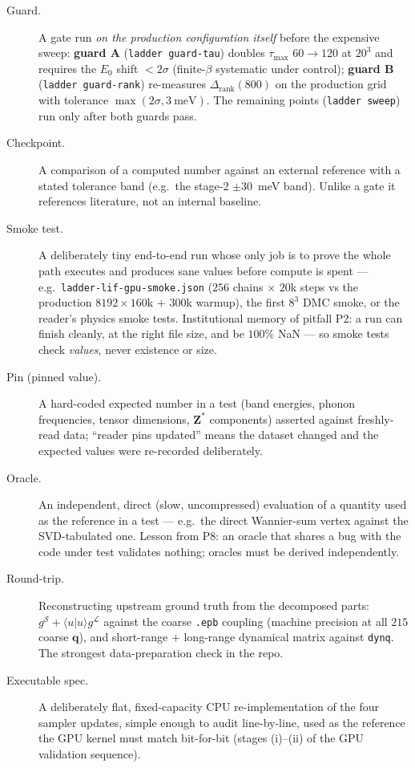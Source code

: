 \documentclass[11pt]{article}
\newcommand{\qv}{\mathbf{q}}
\newcommand{\term}[1]{\item[#1.]}
\begin{document}
\begin{description}
\term{Guard} A gate run \emph{on the production configuration itself} before the
  expensive sweep: \textbf{guard A} (\texttt{ladder guard-tau}) doubles
  $\tau_{\max}$ $60\to120$ at $20^{3}$ and requires the $E_{0}$ shift $<2\sigma$
  (finite-$\beta$ systematic under control); \textbf{guard B}
  (\texttt{ladder guard-rank}) re-measures $\Delta_{\mathrm{rank}}(800)$ on the
  production grid with tolerance $\max(2\sigma,3~\mathrm{meV})$. The remaining points
  (\texttt{ladder sweep}) run only after both guards pass.

\term{Checkpoint} A comparison of a computed number against an external reference
  with a stated tolerance band (e.g.\ the stage-2 $\pm30$~meV band). Unlike a gate it
  references literature, not an internal baseline.

\term{Smoke test} A deliberately tiny end-to-end run whose only job is to prove the
  whole path executes and produces sane values before compute is spent --- e.g.\
  \texttt{ladder-lif-gpu-smoke.json} ($256$ chains $\times$ $20$k steps vs the
  production $8192\times160$k $+$ $300$k warmup), the first $8^{3}$ DMC smoke, or
  the reader's physics smoke tests. Institutional memory of pitfall P2: a run can
  finish cleanly, at the right file size, and be $100\%$ NaN --- so smoke tests check
  \emph{values}, never existence or size.

\term{Pin (pinned value)} A hard-coded expected number in a test (band energies,
  phonon frequencies, tensor dimensions, $\mathbf{Z}^{*}$ components) asserted
  against freshly-read data; ``reader pins updated'' means the dataset changed and
  the expected values were re-recorded deliberately.

\term{Oracle} An independent, direct (slow, uncompressed) evaluation of a quantity
  used as the reference in a test --- e.g.\ the direct Wannier-sum vertex against the
  SVD-tabulated one. Lesson from P8: an oracle that shares a bug with the code under
  test validates nothing; oracles must be derived independently.

\term{Round-trip} Reconstructing upstream ground truth from the decomposed parts:
  $g^{\mathcal S}+\langle u|u\rangle g^{\mathcal L}$ against the coarse \texttt{.epb}
  coupling (machine precision at all $215$ coarse $\qv$), and short-range $+$
  long-range dynamical matrix against \texttt{dynq}. The strongest data-preparation
  check in the repo.

\term{Executable spec} A deliberately flat, fixed-capacity CPU re-implementation of
  the four sampler updates, simple enough to audit line-by-line, used as the
  reference the GPU kernel must match bit-for-bit (stages (i)--(ii) of the GPU
  validation sequence).


\end{description}
\end{document}
